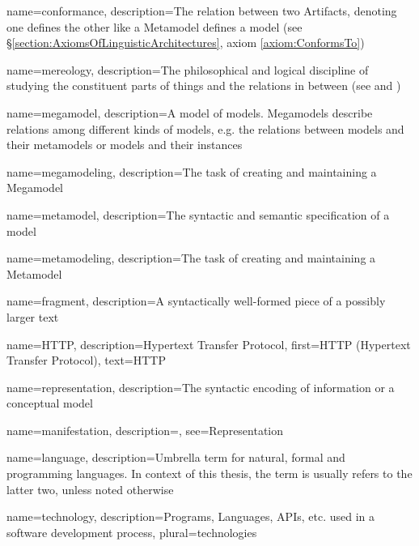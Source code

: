 {
    name={conformance},
    description={The relation between two \glspl{Artifact}, denoting one defines the other like a \gls{Metamodel} defines a model (see §\ref{section:AxiomsOfLinguisticArchitectures}, axiom \ref{axiom:ConformsTo})}
}

{
    name={mereology},
    description={The philosophical and logical discipline of studying the constituent parts of things and the relations in between (see \cite{DBLP:journals/dke/Varzi96} and \cite{SEP:Mereology})}
}

{
    name={megamodel},
    description={A model of models. Megamodels describe relations among different kinds of models, e.g. the relations between models and their metamodels or models and their instances}
}

{
    name={megamodeling},
    description={The task of creating and maintaining a \gls{Megamodel}}
}

{
    name={metamodel},
    description={The syntactic and semantic specification of a model}
}

{
    name={metamodeling},
    description={The task of creating and maintaining a \gls{Metamodel}}
}

{
    name={fragment},
    description={A syntactically well-formed piece of a possibly larger text}
}

{
    name=HTTP,
    description={Hypertext Transfer Protocol},
    first={HTTP (Hypertext Transfer Protocol)},
    text={HTTP}
}

{
    name={representation},
    description={The syntactic encoding of information or a conceptual model}
}

{
    name={manifestation},
    description={},
    see={Representation}   
}

{
    name={language},
    description={Umbrella term for natural, formal and programming languages. In context of this thesis, the term is usually refers to the latter two, unless noted otherwise}
}

{
    name={technology},
    description={Programs, \glspl{Language}, \glspl{API}, etc. used in a software development process},
    plural={technologies}
}

